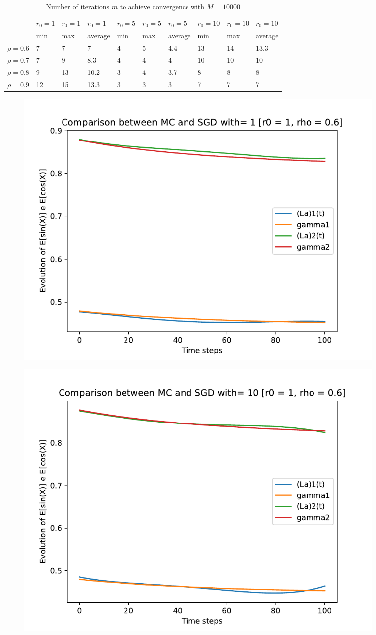 \documentclass[a4paper,11pt,openright]{report}
\begin{document}
\begin{table}[H]
\centering
\addtolength{\leftskip}{-1.5cm}
\addtolength{\rightskip}{-1.5cm}
\begin{tabular}{|c|lllllllll|}
\hline
$ $ & $r_0 = 1$ & $r_0 = 1$ & $r_0 = 1$ & $r_0 = 5$ & $r_0 = 5$ & $r_0 = 5$ & $r_0 = 10$ & $r_0 = 10$ & $r_0 = 10$  \\
$ $ & min & max & average & min & max & average & min & max & average \\ 
\hline
$\rho = 0.6$ & 7 & 7 & 7 & 4 & 5 & 4.4 & 13 & 14 & 13.3 \\

$\rho = 0.7$ & 7 & 9 & 8.3 & 4 & 4 & 4 & 10 & 10 & 10\\

$\rho = 0.8$ & 9 & 13 & 10.2 & 3 & 4 & 3.7 & 8 & 8 & 8\\

$\rho = 0.9$ & 12 & 15 & 13.3 & 3 & 3 & 3 & 7 & 7 & 7\\
\hline
\end{tabular}
\caption{Number of iterations $m$ to achieve convergence with $M = 10000$}
\end{table}
\begin{figure}[H]
\centering
\includegraphics[width=0.9\textwidth]{images/graphics T = 1/n = 4, M = 1 sine and cosine.pdf}
\end{figure}
\begin{figure}[H]
\centering
\includegraphics[width=0.9\textwidth]{images/graphics T = 1/n = 4, M = 10 sine and cosine.pdf}
\end{figure}
\end{document}
